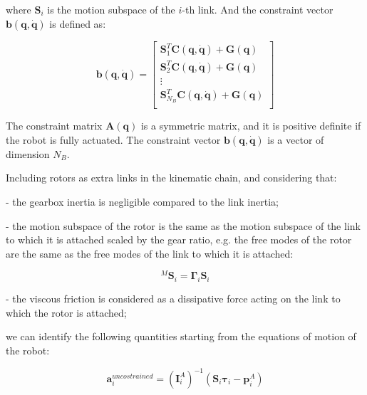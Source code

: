 where $\mathbf{S} _i$ is the motion subspace of the $i$-th link. And the constraint vector $\mathbf{b} (\mathbf{q}, \dot{\mathbf{q}})$ is defined as:

\begin{equation}
    \mathbf{b} (\mathbf{q}, \dot{\mathbf{q}}) = \begin{bmatrix}
        \mathbf{S} _1 ^T \mathbf{C} (\mathbf{q}, \dot{\mathbf{q}}) + \mathbf{G} (\mathbf{q})     \\
        \mathbf{S} _2 ^T \mathbf{C} (\mathbf{q}, \dot{\mathbf{q}}) + \mathbf{G} (\mathbf{q})     \\
        \vdots                                                                                   \\
        \mathbf{S} _{N_B} ^T \mathbf{C} (\mathbf{q}, \dot{\mathbf{q}}) + \mathbf{G} (\mathbf{q}) \\
    \end{bmatrix}
\end{equation}

The constraint matrix $\mathbf{A} (\mathbf{q})$ is a symmetric matrix, and it is positive definite if the robot is fully actuated. The constraint vector $\mathbf{b} (\mathbf{q}, \dot{\mathbf{q}})$ is a vector of dimension $N_B$.

Including rotors as extra links in the kinematic chain, and considering that:

- the gearbox inertia is negligible compared to the link inertia;

- the motion subspace of the rotor is the same as the motion subspace of the link to which it is attached scaled by the gear ratio, e.g. the free modes of the rotor are the same as the free modes of the link to which it is attached:

\begin{equation}
    {} ^M \mathbf{S} _i = \boldsymbol{\Gamma} _i \mathbf{S} _i
\end{equation}

- the viscous friction is considered as a dissipative force acting on the link to which the rotor is attached;

we can identify the following quantities starting from the equations of motion of the robot:

\begin{equation}
    \mathbf{a} ^{uncostrained} _i = (\mathbf{I} ^A _i) ^{-1}(\mathbf{S} _i \boldsymbol{\tau} _i - \mathbf{p} ^A _i)
\end{equation}

